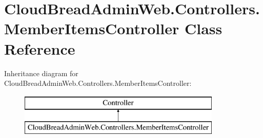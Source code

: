 \hypertarget{class_cloud_bread_admin_web_1_1_controllers_1_1_member_items_controller}{}\section{Cloud\+Bread\+Admin\+Web.\+Controllers.\+Member\+Items\+Controller Class Reference}
\label{class_cloud_bread_admin_web_1_1_controllers_1_1_member_items_controller}
Inheritance diagram for Cloud\+Bread\+Admin\+Web.\+Controllers.\+Member\+Items\+Controller\+:\begin{figure}[H]
\begin{center}
\leavevmode
\includegraphics[height=2.000000cm]{class_cloud_bread_admin_web_1_1_controllers_1_1_member_items_controller}
\end{center}
\end{figure}
